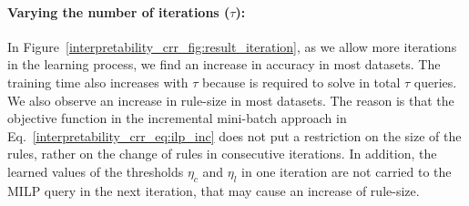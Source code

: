 	\paragraph{Varying the number of iterations ($ \tau $):}   
	In Figure~\ref{interpretability_crr_fig:result_iteration}, as we allow more iterations in the learning process, we find an increase in accuracy in most datasets. The training time also increases with $ \tau $ because {\crr} is required to solve in total $ \tau $ queries. We also observe an increase in rule-size in most datasets. The reason is that the objective function in the incremental mini-batch approach in Eq.~\ref{interpretability_crr_eq:ilp_inc} does not put a restriction on the size of the rules, rather on the change of rules in consecutive iterations.  In addition, the learned values of the thresholds $ \eta_c$ and $ \eta_l $  in one iteration are not carried to the MILP query in the next iteration, that may cause an increase of rule-size. 
	

	



	
	
